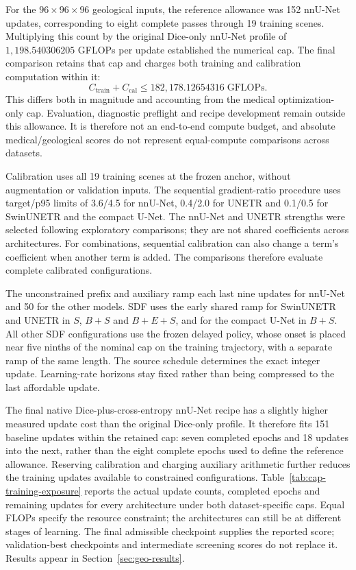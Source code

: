 \documentclass[12pt,a4paper]{article}
\begin{document}
For the $96\times96\times96$ geological inputs, the reference allowance
was 152 nnU-Net updates, corresponding to eight complete passes through
19 training scenes. Multiplying this count by the original Dice-only
nnU-Net profile of $1{,}198.540306205$ GFLOPs per update established the
numerical cap. The final comparison retains that cap and charges both
training and calibration computation within it:
\begin{equation}
 C_{\mathrm{train}}+C_{\mathrm{cal}}
 \leq 182{,}178.12654316\;\mathrm{GFLOPs}.
\label{eq:geological-compute-cap}
\end{equation}
This differs both in magnitude and accounting from the medical
optimization-only cap. Evaluation, diagnostic preflight and recipe
development remain outside this allowance. It is therefore not an
end-to-end compute budget, and absolute medical/geological scores do
not represent equal-compute comparisons across datasets.

Calibration uses all 19 training scenes at the frozen anchor, without
augmentation or validation inputs. The sequential gradient-ratio
procedure uses target/p95 limits of 3.6/4.5 for nnU-Net, 0.4/2.0 for
UNETR and 0.1/0.5 for SwinUNETR and the compact U-Net. The nnU-Net
and UNETR strengths were selected following exploratory comparisons;
they are not shared coefficients across architectures. For combinations,
sequential calibration can also change a term's coefficient when another
term is added. The comparisons therefore evaluate complete calibrated
configurations.

The unconstrained prefix and auxiliary ramp each last nine updates
for nnU-Net and 50 for the other models. SDF uses the early shared
ramp for SwinUNETR and UNETR in $S$, $B+S$ and $B+E+S$, and for
the compact U-Net in $B+S$. All other SDF configurations use the
frozen delayed policy, whose onset is placed near five ninths of the
nominal cap on the training trajectory, with a separate ramp of the
same length. The source schedule determines the exact integer update.
Learning-rate horizons stay fixed rather than being compressed to the
last affordable update.

The final native Dice-plus-cross-entropy nnU-Net recipe has a slightly
higher measured update cost than the original Dice-only profile. It
therefore fits 151 baseline updates within the retained cap: seven
completed epochs and 18 updates into the next, rather than the eight
complete epochs used to define the reference allowance. Reserving
calibration and charging auxiliary arithmetic further reduces the
training updates available to constrained configurations.
Table~\ref{tab:cap-training-exposure} reports the actual update counts,
completed epochs and remaining updates for every architecture under
both dataset-specific caps. Equal FLOPs specify the resource constraint;
the architectures can still be at different stages of learning.
The final admissible checkpoint supplies the reported score;
validation-best checkpoints and intermediate screening scores do not
replace it. Results appear in Section~\ref{sec:geo-results}.
\end{document}
